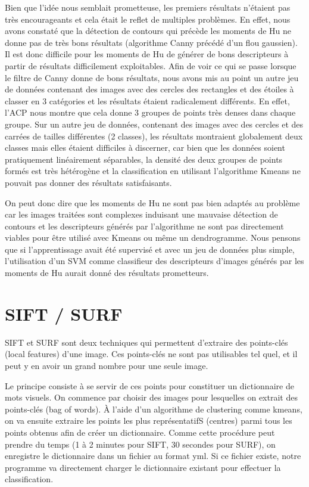 \documentclass[12pt,a4paper,utf8x]{report}
\begin{document}
        Bien que l'idée nous semblait prometteuse, les premiers résultats n'étaient pas très encourageants et cela était le reflet de multiples problèmes. En effet, nous avons constaté que la détection de contours qui précède les moments de Hu ne donne pas de très bons résultats (algorithme Canny précédé d'un flou gaussien). Il est donc difficile pour les moments de Hu de générer de bons descripteurs à partir de résultats difficilement exploitables. Afin de voir ce qui se passe lorsque le filtre de Canny donne de bons résultats, nous avons mis au point un autre jeu de données contenant des images avec des cercles des rectangles et des étoiles à classer en 3 catégories et les résultats étaient radicalement différents. En effet, l'ACP nous montre que cela donne 3 groupes de points très denses dans chaque groupe. Sur un autre jeu de données, contenant des images avec des cercles et des carrées de tailles différentes (2 classes), les résultats montraient globalement deux classes mais elles étaient difficiles à discerner, car bien que les données soient pratiquement linéairement séparables, la densité des deux groupes de points formés est très hétérogène et la classification en utilisant l'algorithme Kmeans ne pouvait pas donner des résultats satisfaisants.

        On peut donc dire que les moments de Hu ne sont pas bien adaptés au problème car les images traitées sont complexes induisant une mauvaise détection de contours et les descripteurs générés par l'algorithme ne sont pas directement viables pour être utilisé avec Kmeans ou même un dendrogramme. Nous pensons que si l'apprentissage avait été supervisé et avec un jeu de données plus simple, l'utilisation d'un SVM comme classifieur des descripteurs d'images générés par les moments de Hu aurait donné des résultats prometteurs.

    \section{SIFT / SURF}
        SIFT et SURF sont deux techniques qui permettent d'extraire des points-clés (local features) d'une image. Ces points-clés ne sont pas utilisables tel quel, et il peut y en avoir un grand nombre pour une seule image. 

        Le principe consiste à se servir de ces points pour constituer un dictionnaire de mots visuels. On commence par choisir des images pour lesquelles on extrait des points-clés (bag of words). À l'aide d'un algorithme de clustering comme kmeans, on va ensuite extraire les points les plus représentatifS (centres) parmi tous les points obtenus afin de créer un dictionnaire. Comme cette procédure peut prendre du temps (1 à 2 minutes pour SIFT, 30 secondes pour SURF), on enregistre le dictionnaire dans un fichier au format yml. Si ce fichier existe, notre programme va directement charger le dictionnaire existant pour effectuer la classification.
\end{document}
